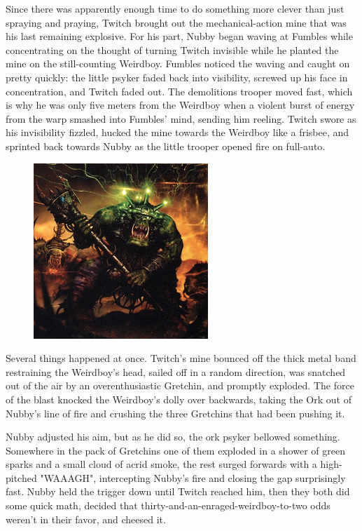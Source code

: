Since there was apparently enough time to do something more clever than just spraying and praying, Twitch brought out the mechanical-action mine that was his last remaining explosive. 
For his part, Nubby began waving at Fumbles while concentrating on the thought of turning Twitch invisible while he planted the mine on the still-counting Weirdboy. 
Fumbles noticed the waving and caught on pretty quickly: 
the little psyker faded back into visibility, screwed up his face in concentration, and Twitch faded out. 
The demolitions trooper moved fast, which is why he was only five meters from the Weirdboy when a violent burst of energy from the warp smashed into Fumbles' mind, sending him reeling. 
Twitch swore as his invisibility fizzled, hucked the mine towards the Weirdboy like a frisbee, and sprinted back towards Nubby as the little trooper opened fire on full-auto.

\begin{figure}
	\begin{center}
		\includegraphics[width=\figwidth]{pics/16/32.png}
	\end{center}
\end{figure}
Several things happened at once. 
Twitch's mine bounced off the thick metal band restraining the Weirdboy's head, sailed off in a random direction, was snatched out of the air by an overenthusiastic Gretchin, and promptly exploded. 
The force of the blast knocked the Weirdboy's dolly over backwards, taking the Ork out of Nubby's line of fire and crushing the three Gretchins that had been pushing it. 


Nubby adjusted his aim, but as he did so, the ork psyker bellowed something. 
Somewhere in the pack of Gretchins one of them exploded in a shower of green sparks and a small cloud of acrid smoke, the rest surged forwards with a high-pitched "WAAAGH", intercepting Nubby's fire and closing the gap surprisingly fast. 
Nubby held the trigger down until Twitch reached him, then they both did some quick math, decided that thirty-and-an-enraged-weirdboy-to-two odds weren't in their favor, and cheesed it.

